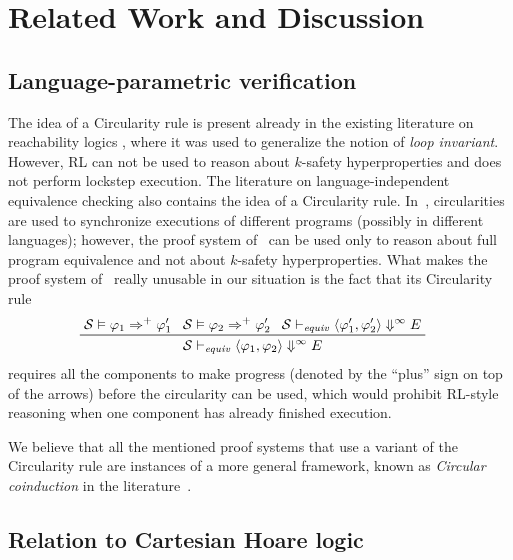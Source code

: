 
\section{Related Work and Discussion}\label{sec:discussion}

\subsection{Language-parametric verification}

The idea of a Circularity rule is present already 
in the existing literature on reachability logics \cite{RosuS12oopsla,RosuSCM13lics,StefanescuCMMSR19},
where it was used to generalize the notion of \emph{loop invariant}.
However, RL can not be used to reason about $k$-safety hyperproperties and does not perform lockstep execution.
The literature on language-independent equivalence checking also contains the idea of a Circularity rule.
In~\cite{CiobacaLRR16}, circularities are used to synchronize executions of different programs (possibly in different languages);
however, the proof system of~\cite{CiobacaLRR16} can be used only to reason about full program equivalence
and not about $k$-safety hyperproperties.
What makes the proof system of~\cite{CiobacaLRR16} really unusable in our situation is the fact that its
Circularity rule
\begin{align*}
  & \prftree[l]{}
    { \mathcal{S} \vDash \varphi_1 \Rightarrow^+ \varphi^\prime_1 }
    { \mathcal{S} \vDash \varphi_2 \Rightarrow^+ \varphi^\prime_2 }
    { \mathcal{S} \vdash_{\mathit{equiv}} \langle \varphi^\prime_1, \varphi^\prime_2 \rangle \Downarrow^{\infty} E}
    { \mathcal{S} \vdash_{\mathit{equiv}} \langle \varphi_1, \varphi_2 \rangle \Downarrow^{\infty} E}
\end{align*}
requires all the components to make progress (denoted by the ``plus'' sign on top of the arrows) before the circularity can be used,
which would prohibit RL-style reasoning when one component has already finished execution.

We believe that all the mentioned proof systems that use a variant of the Circularity rule are instances of a more general
framework, known as \emph{Circular coinduction} in the literature~\cite{RosuL09CircularCoinduction}.



\subsection{Relation to Cartesian Hoare logic}

